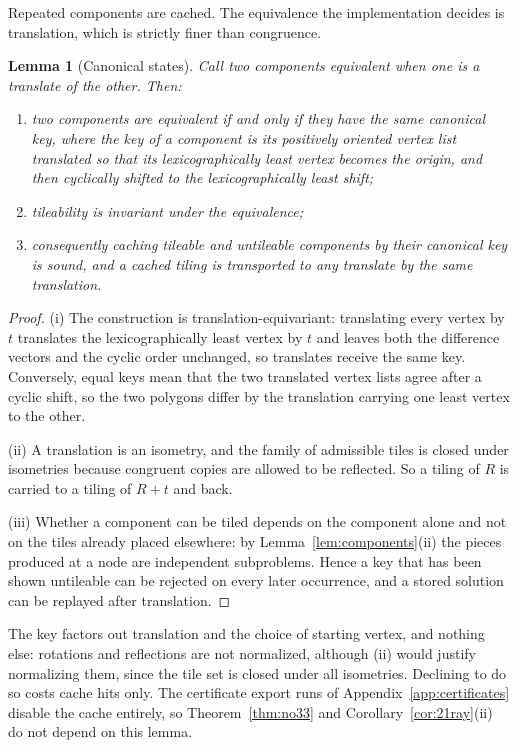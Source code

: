 \documentclass[11pt]{amsart}
\newtheorem{lemma}[theorem]{Lemma}
\theoremstyle{definition}
\theoremstyle{remark}
\begin{document}
Repeated components are cached.  The equivalence the implementation decides is
translation, which is strictly finer than congruence.

\begin{lemma}[Canonical states]\label{lem:memo}
Call two components equivalent when one is a translate of the other.  Then:
\begin{enumerate}[label=\textup{(\roman*)}]
\item two components are equivalent if and only if they have the same
      canonical key, where the key of a component is its positively oriented
      vertex list translated so that its lexicographically least vertex
      becomes the origin, and then cyclically shifted to the
      lexicographically least shift;
\item tileability is invariant under the equivalence;
\item consequently caching tileable and untileable components by their
      canonical key is sound, and a cached tiling is transported to any
      translate by the same translation.
\end{enumerate}
\end{lemma}

\begin{proof}
(i)  The construction is translation-equivariant: translating every vertex by
$t$ translates the lexicographically least vertex by $t$ and leaves both the
difference vectors and the cyclic order unchanged, so translates receive the
same key.  Conversely, equal keys mean that the two translated vertex lists
agree after a cyclic shift, so the two polygons differ by the translation
carrying one least vertex to the other.

(ii)  A translation is an isometry, and the family of admissible tiles is
closed under isometries because congruent copies are allowed to be reflected.
So a tiling of $R$ is carried to a tiling of $R+t$ and back.

(iii)  Whether a component can be tiled depends on the component alone and
not on the tiles already placed elsewhere: by
Lemma~\ref{lem:components}(ii) the pieces produced at a node are independent
subproblems.  Hence a key that has been shown untileable can be rejected on
every later occurrence, and a stored solution can be replayed after
translation.
\end{proof}

The key factors out translation and the choice of starting vertex, and
nothing else: rotations and reflections are not normalized, although (ii)
would justify normalizing them, since the tile set is closed under all
isometries.  Declining to do so costs cache hits only.  The certificate
export runs of Appendix~\ref{app:certificates} disable the cache entirely,
so Theorem~\ref{thm:no33} and Corollary~\ref{cor:21ray}(ii) do not depend on
this lemma.
\end{document}
